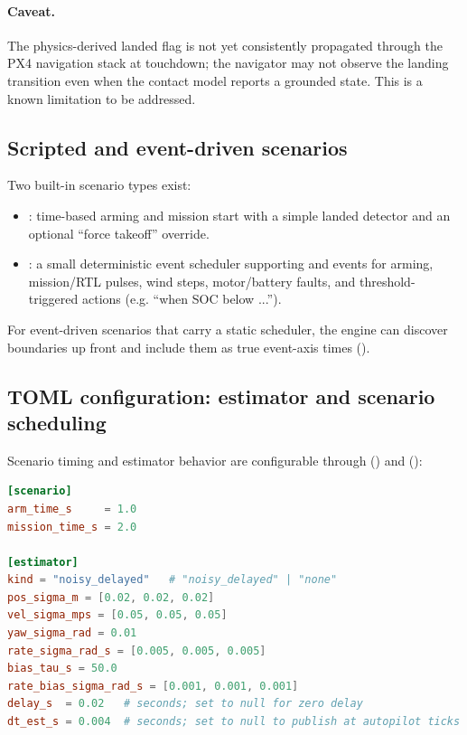 \paragraph{Caveat.}
The physics-derived landed flag is not yet consistently propagated through the PX4 navigation stack at touchdown; the navigator may not observe the landing transition even when the contact model reports a grounded state. This is a known limitation to be addressed.

\subsection{Scripted and event-driven scenarios}

Two built-in scenario types exist:
\begin{itemize}[leftmargin=*,itemsep=2pt]
  \item {}: time-based arming and mission start with a simple landed detector and an optional ``force takeoff'' override.
  \item {}: a small deterministic event scheduler supporting  and  events for arming, mission/RTL pulses, wind steps, motor/battery faults, and threshold-triggered actions (e.g. ``when SOC below ...'').
\end{itemize}

For event-driven scenarios that carry a static scheduler, the engine can discover  boundaries up front and include them as true event-axis times ().

\subsection{TOML configuration: estimator and scenario scheduling}
\label{sec:estimator-toml}

Scenario timing and estimator behavior are configurable through \code{[scenario]} () and \code{[estimator]} ():

\begin{lstlisting}[language=toml]
[scenario]
arm_time_s     = 1.0
mission_time_s = 2.0

[estimator]
kind = "noisy_delayed"   # "noisy_delayed" | "none"
pos_sigma_m = [0.02, 0.02, 0.02]
vel_sigma_mps = [0.05, 0.05, 0.05]
yaw_sigma_rad = 0.01
rate_sigma_rad_s = [0.005, 0.005, 0.005]
bias_tau_s = 50.0
rate_bias_sigma_rad_s = [0.001, 0.001, 0.001]
delay_s  = 0.02   # seconds; set to null for zero delay
dt_est_s = 0.004  # seconds; set to null to publish at autopilot ticks
\end{lstlisting}

